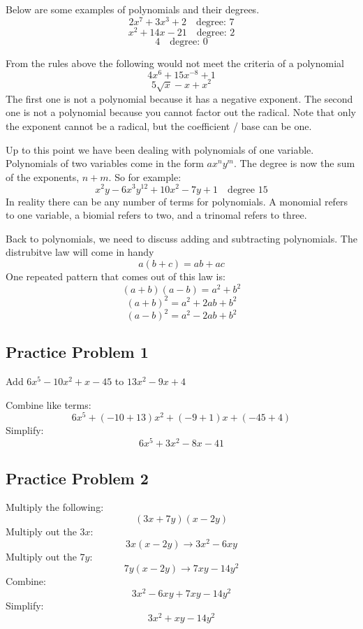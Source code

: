 \documentclass[12pt, letterpaper, oneside]{book}
\begin{document}
Below are some examples of polynomials and their degrees.
\[2x^7 + 3x^3 + 2 \quad \text{degree: 7}\]
\[x^2 + 14x - 21 \quad \text{degree: 2}\]
\[4 \quad \text{degree: 0}\]

From the rules above the following would not meet the criteria of a polynomial
\[4x^6 + 15x^{-8} + 1\]
\[5\sqrt{x} - x + x^2\]
The first one is not a polynomial because it has a negative exponent. The second one is not a polynomial because you cannot factor out the radical. Note that only the exponent cannot be a radical, but the coefficient / base can be one.

Up to this point we have been dealing with polynomials of one variable. Polynomials of two variables come in the form $ax^ny^m$. The degree is now the sum of the exponents, $n+m$. So for example:
\[x^2y - 6x^3y^{12}+10x^2-7y+1 \quad \text{degree 15} \]
In reality there can be any number of terms for polynomials. A monomial refers to one variable, a biomial refers to two, and a trinomal refers to three.

Back to polynomials, we need to discuss adding and subtracting polynomials. The distrubitve law will come in handy
\begin{equation}
    a(b+c) = ab + ac
\end{equation}
One repeated pattern that comes out of this law is:
\begin{equation}
    (a+b)(a-b) = a^2 + b^2
\end{equation}
\begin{equation}
    (a+b)^2=a^2+2ab+b^2
\end{equation}
\begin{equation}
    (a-b)^2=a^2-2ab+b^2
\end{equation}
\subsection{Practice Problem 1}
Add $6x^5 - 10x^2 + x - 45$ to $13x^2 - 9x + 4$

Combine like terms:
\[6x^5 + (-10 + 13)x^2 + (-9 + 1)x + (-45 + 4)\]
Simplify:
\[6x^5 + 3x^2 -8x - 41\]

\subsection{Practice Problem 2}
Multiply the following:
\[(3x + 7y)(x-2y)\]
Multiply out the $3x$:
\[3x(x-2y) \rightarrow 3x^2 - 6xy \]
Multiply out the $7y$:
\[7y(x-2y) \rightarrow 7xy-14y^2 \]
Combine:
\[3x^2 - 6xy + 7xy-14y^2\]
Simplify:
\[3x^2 + xy - 14y^2\]
\end{document}

